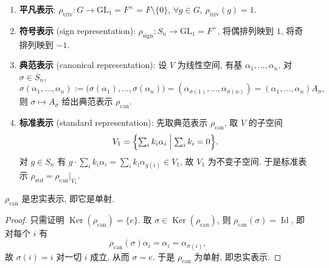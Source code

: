 \begin{example}\label{ex:group-reps}
\mbox{}\par\vspace{-0.2em}
\begin{enumerate}
\item \textbf{平凡表示}: $\rho_{\mathrm{triv}}\colon G\to\mathrm{GL}_1=F^\times=F\setminus\{0\}$,
$\forall g\in G$, $\rho_{\mathrm{triv}}(g)=1$.

\item \textbf{符号表示} (sign representation): $\rho_{\mathrm{sign}}\colon S_n\to\mathrm{GL}_1=F^\times$,
将偶排列映到 $1$, 将奇排列映到 $-1$.

\item \textbf{典范表示} (canonical representation): 设 $V$ 为线性空间, 有基 $\alpha_1,\dots,\alpha_n$.
对 $\sigma\in S_n$,
\begin{equation*}
  \sigma(\alpha_1,\dots,\alpha_n):=\bigl(\sigma(\alpha_1),\dots,\sigma(\alpha_n)\bigr)
  =(\alpha_{\sigma(1)},\dots,\alpha_{\sigma(n)})=(\alpha_1,\dots,\alpha_n)A_\sigma ,
\end{equation*}
则 $\sigma\mapsto A_\sigma$ 给出典范表示 $\rho_{\mathrm{can}}$.

\item \textbf{标准表示} (standard representation): 先取典范表示 $\rho_{\mathrm{can}}$, 取 $V$ 的子空间
\begin{equation*}
  V_1=\Bigl\{\textstyle\sum_i k_i\alpha_i \Bigm| \sum_i k_i=0\Bigr\}.
\end{equation*}
对 $g\in S_n$ 有 $g\cdot\sum_i k_i\alpha_i=\sum_i k_i\alpha_{g(i)}\in V_1$, 故 $V_1$ 为不变子空间.
于是标准表示 $\rho_{\mathrm{std}}=\rho_{\mathrm{can}}|_{V_1}$.
\end{enumerate}
\end{example}

\begin{proposition}\label{prop:can-faithful}
$\rho_{\mathrm{can}}$ 是忠实表示, 即它是单射.
\end{proposition}

\begin{proof}
只需证明 $\operatorname{Ker}(\rho_{\mathrm{can}})=\{e\}$.
取 $\sigma\in\operatorname{Ker}(\rho_{\mathrm{can}})$, 则 $\rho_{\mathrm{can}}(\sigma)=\operatorname{Id}$, 即对每个 $i$ 有
\begin{equation*}
  \rho_{\mathrm{can}}(\sigma)\alpha_i=\alpha_i=\alpha_{\sigma(i)},
\end{equation*}
故 $\sigma(i)=i$ 对一切 $i$ 成立, 从而 $\sigma=e$. 于是 $\rho_{\mathrm{can}}$ 为单射, 即忠实表示.
\end{proof}

